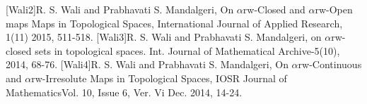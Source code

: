 \begin{thebibliography}{99}
 [Wali2]R. S. Wali and Prabhavati S. Mandalgeri, On $\alpha$rw-Closed and $\alpha$rw-Open maps Maps in Topological Spaces, International Journal of Applied Research, 1(11) 2015, 511-518.
 [Wali3]R. S. Wali and Prabhavati S. Mandalgeri, on $\alpha$rw-closed sets in topological spaces. Int. Journal of Mathematical Archive-5(10), 2014, 68-76.
 [Wali4]R. S. Wali and Prabhavati S. Mandalgeri, On $\alpha$rw-Continuous and $\alpha$rw-Irresolute Maps in Topological Spaces, IOSR Journal of MathematicsVol. 10, Issue 6, Ver. Vi Dec. 2014, 14-24.
\end{thebibliography}
